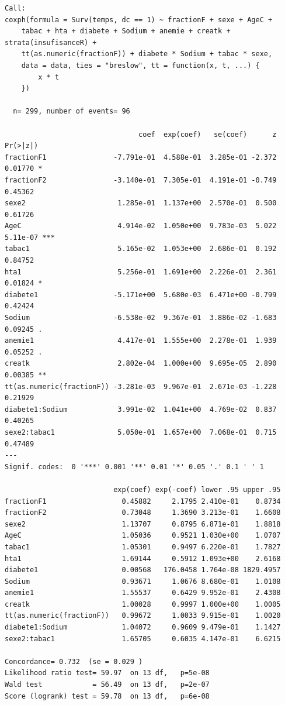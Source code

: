 \documentclass[
  letterpaper,
  DIV=11,
  numbers=noendperiod]{scrartcl}
\begin{document}
\begin{verbatim}
Call:
coxph(formula = Surv(temps, dc == 1) ~ fractionF + sexe + AgeC + 
    tabac + hta + diabete + Sodium + anemie + creatk + strata(insufisanceR) + 
    tt(as.numeric(fractionF)) + diabete * Sodium + tabac * sexe, 
    data = data, ties = "breslow", tt = function(x, t, ...) {
        x * t
    })

  n= 299, number of events= 96 

                                coef  exp(coef)   se(coef)      z Pr(>|z|)    
fractionF1                -7.791e-01  4.588e-01  3.285e-01 -2.372  0.01770 *  
fractionF2                -3.140e-01  7.305e-01  4.191e-01 -0.749  0.45362    
sexe2                      1.285e-01  1.137e+00  2.570e-01  0.500  0.61726    
AgeC                       4.914e-02  1.050e+00  9.783e-03  5.022 5.11e-07 ***
tabac1                     5.165e-02  1.053e+00  2.686e-01  0.192  0.84752    
hta1                       5.256e-01  1.691e+00  2.226e-01  2.361  0.01824 *  
diabete1                  -5.171e+00  5.680e-03  6.471e+00 -0.799  0.42424    
Sodium                    -6.538e-02  9.367e-01  3.886e-02 -1.683  0.09245 .  
anemie1                    4.417e-01  1.555e+00  2.278e-01  1.939  0.05252 .  
creatk                     2.802e-04  1.000e+00  9.695e-05  2.890  0.00385 ** 
tt(as.numeric(fractionF)) -3.281e-03  9.967e-01  2.671e-03 -1.228  0.21929    
diabete1:Sodium            3.991e-02  1.041e+00  4.769e-02  0.837  0.40265    
sexe2:tabac1               5.050e-01  1.657e+00  7.068e-01  0.715  0.47489    
---
Signif. codes:  0 '***' 0.001 '**' 0.01 '*' 0.05 '.' 0.1 ' ' 1

                          exp(coef) exp(-coef) lower .95 upper .95
fractionF1                  0.45882     2.1795 2.410e-01    0.8734
fractionF2                  0.73048     1.3690 3.213e-01    1.6608
sexe2                       1.13707     0.8795 6.871e-01    1.8818
AgeC                        1.05036     0.9521 1.030e+00    1.0707
tabac1                      1.05301     0.9497 6.220e-01    1.7827
hta1                        1.69144     0.5912 1.093e+00    2.6168
diabete1                    0.00568   176.0458 1.764e-08 1829.4957
Sodium                      0.93671     1.0676 8.680e-01    1.0108
anemie1                     1.55537     0.6429 9.952e-01    2.4308
creatk                      1.00028     0.9997 1.000e+00    1.0005
tt(as.numeric(fractionF))   0.99672     1.0033 9.915e-01    1.0020
diabete1:Sodium             1.04072     0.9609 9.479e-01    1.1427
sexe2:tabac1                1.65705     0.6035 4.147e-01    6.6215

Concordance= 0.732  (se = 0.029 )
Likelihood ratio test= 59.97  on 13 df,   p=5e-08
Wald test            = 56.49  on 13 df,   p=2e-07
Score (logrank) test = 59.78  on 13 df,   p=6e-08
\end{verbatim}
\end{document}
